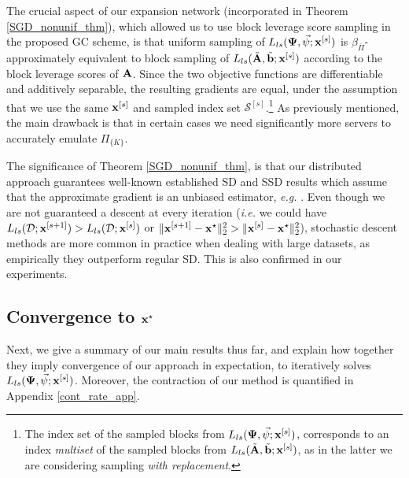 \documentclass[journal,letterpaper,onecolumn,twoside,nofonttune]{IEEEtran}
\newcommand{\D}{\mathcal{D}}
\newcommand{\Scal}{\mathcal{S}}
\newcommand{\bb}{\bold{b}}
\newcommand{\xb}{\bold{x}}
\newcommand{\Ab}{\bold{A}}
\newcommand{\Abt}{\tilde{\Ab}}
\newcommand{\bbt}{\tilde{\bb}}
\newcommand{\Pib}{\bar{\Pi}}
\newcommand{\PsiB}{\bold{\Psi}}
\newcommand{\psiv}{\vec{\psi}}
\begin{document}
The crucial aspect of our expansion network (incorporated in Theorem \ref{SGD_nonunif_thm}), which allowed us to use block leverage score sampling in the proposed GC scheme, is that uniform sampling of $L_{ls}(\PsiB,\psiv;\xb^{[s]})$ is $\beta_{\Pib}$-approximately equivalent to block sampling of $L_{ls}(\Abt,\bbt;\xb^{[s]})$ according to the block leverage scores of $\Ab$. Since the two objective functions are differentiable and additively separable, the resulting gradients are equal, under the assumption that we use the same $\xb^{[s]}$ and sampled index set $\Scal^{[s]}$.\footnote{The index set of the sampled blocks from $L_{ls}(\PsiB,\psiv;\xb^{[s]})$, corresponds to an index \textit{multiset} of the sampled blocks from $L_{ls}(\Abt,\bbt;\xb^{[s]})$, as in the latter we are considering sampling \textit{with replacement}.} As previously mentioned, the main drawback is that in certain cases we need significantly more servers to accurately emulate $\Pi_{\{K\}}$.

The significance of Theorem \ref{SGD_nonunif_thm}, is that our distributed approach guarantees well-known established SD and SSD results which assume that the approximate gradient is an unbiased estimator, \textit{e.g.} \cite[Chapter 14]{SB14}. Even though we are not guaranteed a descent at every iteration (\textit{i.e.} we could have $L_{ls}(\D;\xb^{[s+1]})>L_{ls}(\D;\xb^{[s]})$ or $\|\xb^{[s+1]}-\xb^\star\|_2^2>\|\xb^{[s]}-\xb^\star\|_2^2$), stochastic descent methods are more common in practice when dealing with large datasets, as empirically they outperform regular SD. This is also confirmed in our experiments.

\subsection{Convergence to $\xb^\star$}
\label{convergence_subsec}

Next, we give a summary of our main results thus far, and explain how together they imply convergence of our approach in expectation, to iteratively solves $L_{ls}(\PsiB,\psiv;\xb^{[s]})$. Moreover, the contraction of our method is quantified in Appendix \ref{cont_rate_app}.
\end{document}
